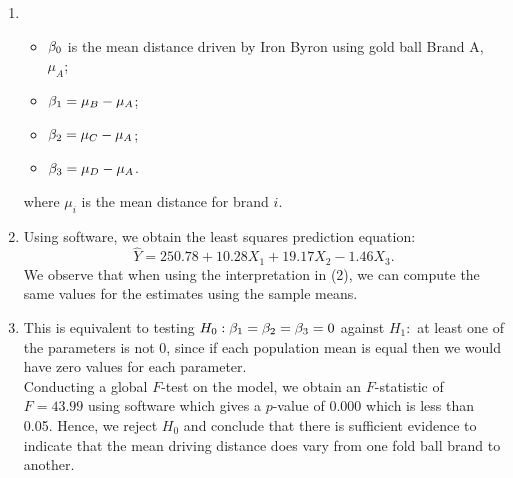 \documentclass{report}
\begin{document}
{\begin{enumerate}
		$$X_1=\begin{cases}
			1 & \text{ if Brand B;}\\
			0 & \text{ otherwise.}
		\end{cases}\quad 
		X_2=\begin{cases}
			1 & \text{ if Brand C;}\\
			0 & \text{ otherwise.}
		\end{cases}\quad
		X_3=\begin{cases}
			1 & \text{ if Brand D;}\\
			0 & \text{ otherwise.}
		\end{cases}$$
		so the model relating $E(Y)$, the mean distance driven to the single qualitative variable, gold ball brand, is
		$$E(Y)=\gb_0+\gb_1X_1+\gb_2X_2+\gb_3X_3.$$
		\item 
		\begin{itemize}
			\item $\beta_0$ is the mean distance driven by Iron Byron using gold ball Brand A, $\mu_A$;
			\item $\beta_1=\mu_B-\mu_A$;
			\item $\beta_2=\mu_C-\mu_A$;
			\item $\beta_3=\mu_D-\mu_A$.
		\end{itemize}
		where $\mu_i$ is the mean distance for brand $i$.
		\item Using software, we obtain the least squares prediction equation:
		$$\hat{Y}=250.78+10.28X_1+19.17X_2-1.46X_3.$$
		We observe that when using the interpretation in (2), we can compute the same values for the estimates using the sample means.
		\item This is equivalent to testing $H_0:\beta_1=\beta_2=\beta_3=0$ against $H_1:$ at least one of the parameters is not 0, since if each population mean is equal then we would have zero values for each parameter.\\
		
		Conducting a global $F$-test on the model, we obtain an $F$-statistic of $F=43.99$ using software which gives a $p$-value of $0.000$ which is less than 0.05. Hence, we reject $H_0$ and conclude that there is sufficient evidence to indicate that the mean driving distance does vary from one fold ball brand to another.
	\end{enumerate}
	}
	\vspace{1mm}
	\vspace{1mm}
\end{document}
